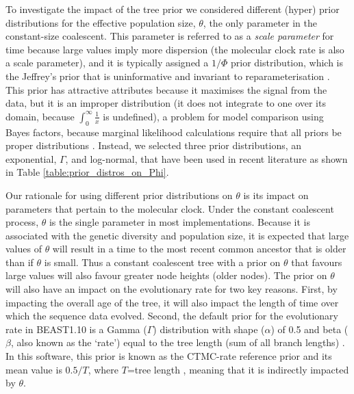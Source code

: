 \documentclass[10pt,letterpaper]{article}
\begin{document}
To investigate the impact of the tree prior we considered different (hyper) prior distributions for the effective population size, $\theta$, the only parameter in the constant-size coalescent. This parameter is referred to as a \textit{scale parameter} for time because large values imply more dispersion (the molecular clock rate is also a scale parameter), and it is typically assigned a $1/\Phi$ prior distribution, which is the Jeffrey's prior that is uninformative and invariant to reparameterisation  \cite{drummond2002estimating}. This prior has attractive attributes because it maximises the signal from the data, but it is an improper distribution (it does not integrate to one over its domain, because $\int_{0}^{\infty} \frac{1}{x}$ is undefined), a problem for model comparison using Bayes factors, because marginal likelihood calculations require that all priors be proper distributions \cite{r2019marginal, baele2013proper}. Instead, we selected three prior distributions, an exponential, $\Gamma$, and log-normal, that have been used in recent literature as shown in Table \ref{table:prior_distros_on_Phi}.

Our rationale for using different prior distributions on $\theta$ is its impact on parameters that pertain to the molecular clock. Under the constant coalescent process, $\theta$ is the single parameter in most implementations. Because it is associated with the genetic diversity and population size, it is expected that large values of $\theta$ will result in a time to the most recent common ancestor that is older than if $\theta$ is small. Thus a constant coalescent tree with a prior on $\theta$ that favours large values will also favour greater node heights (older nodes). The prior on $\theta$ will also have an impact on the evolutionary rate for two key reasons. First, by impacting the overall age of the tree, it will also impact the length of time over which the sequence data evolved. Second, the default prior for the evolutionary rate in BEAST1.10 is a Gamma ($\Gamma$) distribution with shape ($\alpha$) of 0.5 and beta ($\beta$, also known as the `rate') equal to the tree length (sum of all branch lengths) \cite{wang2014priors, ferreira2008bayesian}. In this software, this prior is known as the CTMC-rate reference prior and its mean value is $0.5 / T$, where $T$=tree length \cite{ferreira2008bayesian}, meaning that it is indirectly impacted by $\theta$. 
\end{document}
